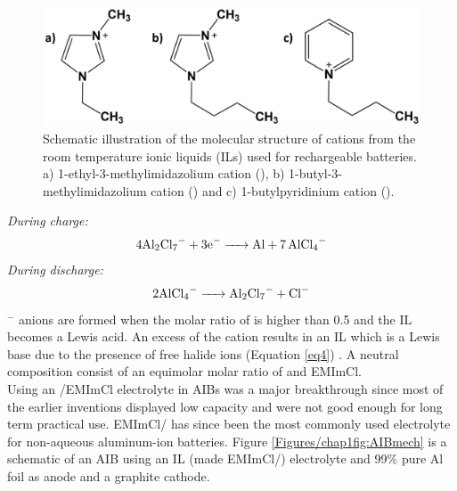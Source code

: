 \begin{figure}[tbh!]
\centering
\includegraphics[width=\textwidth]{Figures/chap1fig/cations}
\caption{Schematic illustration of the molecular structure of cations from the room temperature ionic liquids (ILs) used for rechargeable batteries. a) 1-ethyl-3-methylimidazolium cation (), b) 1-butyl-3-methylimidazolium cation () and c) 1-butylpyridinium cation ().}
\label{Figures/chap1fig:cations}
\end{figure}
\textit{During charge:}
\begin{equation} \label{eq3}
4\ce{Al2Cl7^{-}} + 3\ce{e- -> Al + 7AlCl4^{-}} 
\end{equation}
\textit{During discharge:}
\begin{equation} \label{eq4}
2\ce{AlCl4^{-} -> Al2Cl7^{-} + Cl-}  
\end{equation}
$^-$ anions are formed when the molar ratio of  is higher than 0.5 and the IL becomes a Lewis acid. An excess of the cation results in an IL which is a Lewis base due to the presence of free halide ions (Equation \ref{eq4}) \cite{holbrey_ionic_1999}. A neutral composition consist of an equimolar molar ratio of  and EMImCl. \\
Using an /EMImCl electrolyte in AIBs was a major breakthrough since most of the earlier inventions displayed low capacity and were not good enough for long term practical use. EMImCl/  has since been the most commonly used electrolyte for non-aqueous aluminum-ion batteries.
Figure \ref{Figures/chap1fig:AIBmech} is a schematic of an AIB using an IL  (made EMImCl/) electrolyte and 99\% pure Al foil as anode and a graphite cathode. 

